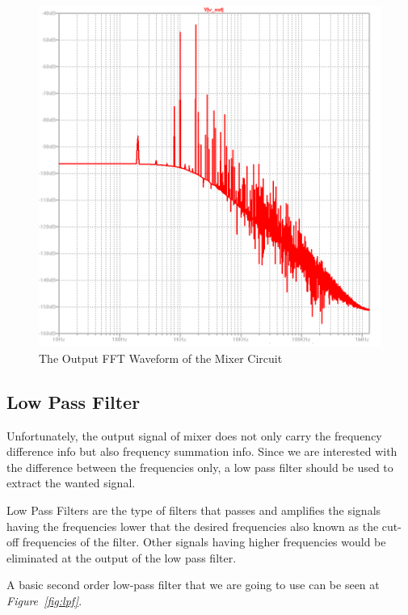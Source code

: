 \documentclass[paper]{IEEEtran}
\begin{document}
\begin{figure}[h!]
\setlength{\unitlength}{\textwidth}
\center 
\includegraphics[width=0.45\unitlength]{mixer_fft3.png}
\caption{\label{fig:mixerfft} The Output FFT Waveform of the Mixer Circuit }
\end{figure}	

		
\subsection{Low Pass Filter}


	Unfortunately, the output signal of mixer does not only carry the frequency difference info but also frequency summation info. Since we are interested with the difference between the frequencies only, a low pass filter should be used to extract the wanted signal.

	Low Pass Filters are the type of filters that passes and amplifies the signals having the frequencies lower that the desired frequencies also known as the cut-off frequencies of the filter. Other signals having higher frequencies would be eliminated at the output of the low pass filter. 	

	A basic second order low-pass filter that we are going to use can be seen at \textit{Figure~\ref{fig:lpf}}. 	\\
	 
\end{document}
